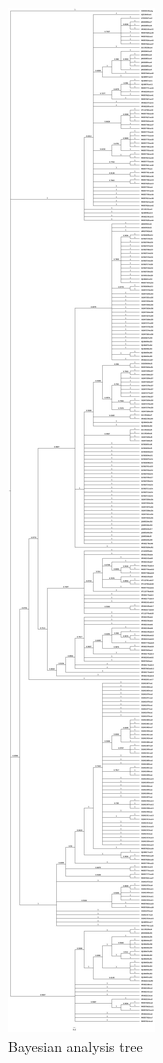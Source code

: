 \begin{figure}[htbp]
\centering
\includegraphics[keepaspectratio,width=\textwidth,height=0.75\textheight]{images/mcmc.jpg}
\caption{Bayesian analysis tree}
\end{figure}

